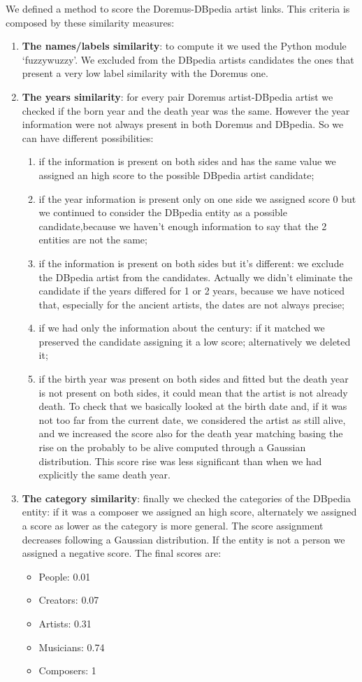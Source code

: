\documentclass[paper=a4, fontsize=11pt]{scrartcl}
\begin{document}
We defined a method to score the Doremus-DBpedia artist links. This criteria is composed by these similarity measures:
\begin{enumerate}
\item \textbf{The names/labels similarity}: to compute it we used the Python module `fuzzywuzzy'. We excluded from the DBpedia artists candidates the ones that present a very low label similarity with the Doremus one.
\item \textbf{The years similarity}: for every pair Doremus artist-DBpedia artist we checked if the born year and the death year was the same. However the year information were not always present in both Doremus and DBpedia. So we can have different possibilities:
\begin{enumerate}
\item if the information is present on both sides and has the same value we assigned an high score to the possible DBpedia artist candidate;
\item if the year information is present only on one side we assigned score 0 but we continued to consider the DBpedia entity as a possible candidate,because we haven't enough information to say that the 2 entities are not the same;
\item if the information is present on both sides but it's different: we exclude the DBpedia artist from the candidates. Actually we didn't eliminate the candidate if the years differed for 1 or 2 years, because we have noticed that, especially for the ancient artists, the dates are not always precise;
\item if we had only the information about the century: if it matched we preserved the candidate assigning it a low score; alternatively we deleted it;
\item if the birth year was present on both sides and fitted but the death year is not present on both sides, it could mean that the artist is not already death. To check that we basically looked at the birth date and, if it was not too far from the current date, we considered the artist as still alive, and we increased the score also for the death year matching basing the rise on the probably to be alive computed through a Gaussian distribution. This score rise was less significant than when we had explicitly the same death year.

\end{enumerate}
\item \textbf{The category similarity}: finally we checked the categories of the DBpedia entity: if it was a composer we assigned an high score, alternately we assigned a score as lower as the category is more general. The score assignment decreases following a Gaussian distribution. If the entity is not a person we assigned a negative score.
The final scores are:
\begin{itemize}
\item People: 0.01
\item Creators: 0.07
\item Artists: 0.31
\item Musicians: 0.74
\item Composers: 1
\end{itemize}


\end{enumerate}
\end{document}
